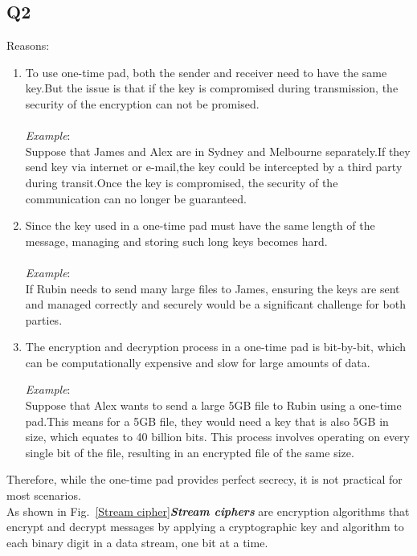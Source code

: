 \documentclass{article}
\begin{document}
\subsection{Q2}
	Reasons:
	\begin{enumerate}
		\item To use one-time pad, both the sender and receiver need to have the same key.But the issue is that if the key is compromised during transmission, the security of the encryption can not be promised.\\\\
		\textit{Example}:\\
		Suppose that James and Alex are in Sydney and Melbourne separately.If they send key via internet or e-mail,the key could be intercepted by a third party during transit.Once the key is compromised, the security of the communication can no longer be guaranteed.

		\item Since the key used in a one-time pad must have the same length of the message, managing and storing such long keys becomes hard.\\\\
		\textit{Example}:\\
		If Rubin needs to send many large files to James, ensuring the keys are sent and managed correctly and securely would be a significant challenge for both parties.

		\item The encryption and decryption process in a one-time pad is bit-by-bit, which can be computationally expensive and slow for large amounts of data.

		\textit{Example}:\\
		Suppose that Alex wants to send a large 5GB file to Rubin using a one-time pad.This means for a 5GB file, they would need a key that is also 5GB in size, which equates to 40 billion bits. This process involves operating on every single bit of the file, resulting in an encrypted file of the same size.

	\end{enumerate}
	Therefore, while the one-time pad provides perfect secrecy, it is not practical for most scenarios.\\

\newpage
	As shown in Fig.~\ref{Stream cipher}\textbf{\textit{Stream ciphers}} are encryption algorithms that encrypt and decrypt messages by applying a cryptographic key and algorithm to each binary digit in a data stream, one bit at a time\cite{OktaStreamCipher}.
\end{document}
